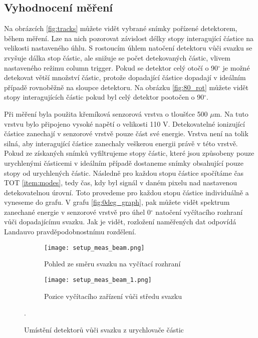 \subsection{Vyhodnocení měření}
	Na obrázcích \ref{fig:tracks} můžete vidět vybrané snímky pořízené detektorem, během měření. Lze na nich pozorovat závislost délky stopy interagující částice na velikosti nastaveného úhlu. S rostoucím úhlem natočení detektoru vůči svazku se zvyšuje dálka stop částic, ale snižuje se počet detekovaných částic, vlivem nastaveného režimu column trigger. Pokud se detektor celý otočí o 90$^{\circ}$ je možné detekovat větší množství částic, protože dopadající částice dopadají v ideálním případě rovnoběžně na sloupce detektoru. Na obrázku \ref{fig:80_rot} můžete vidět stopy interagujících částic pokud byl celý detektor pootočen o 90$^{\circ}$.
	
	\par
	Při měření byla použita křemíková senzorová vrstva o tloušťce 500 $\mu$m. Na tuto vrstvu bylo připojeno vysoké napětí o velikosti 110 V. Detekovatelné ionizující částice zanechají v senzorové vrstvě pouze část své energie. Vrstva není na tolik silná, aby interagující částice zanechaly veškerou energii právě v této vrstvě. Pokud ze získaných snímků vyfiltrujeme stopy částic, které jsou způsobeny pouze urychlenými částicemi v ideálním případě dostaneme snímky obsahující pouze stopy od urychlených částic. Následně pro každou stopu částice spočítáme čas TOT \ref{item:modes}, tedy čas, kdy byl signál v daném pixelu nad nastavenou detekovatelnou úrovní. Toto provedeme pro každou stopu částice individuálně a vyneseme do grafu. V grafu \ref{fig:0deg_graph}, pak můžete vidět spektrum zanechané energie v senzorové vrstvě pro úhel 0$^{\circ}$ natočení vyčítacího rozhraní vůči dopadajícímu svazku. Jak je vidět, rozložení naměřených dat odpovídá Landauvo pravděpodobnostnímu rozdělení. %
	
	\begin{figure}[h!]
		\captionsetup{justification=centering}
		\begin{subfigure}{0.5\textwidth}
			\centering
			\texttt{[image: setup\_meas\_beam.png]}
			\caption{Pohled ze směru svazku na vyčítací rozhraní}
			\label{fig:setup_meas_beam}
		\end{subfigure}
		\begin{subfigure}{0.5\textwidth}
			\centering
			\texttt{[image: setup\_meas\_beam\_1.png]}
			\caption{Pozice vyčítacího zařízení vůči středu svazku}
			\label{fig:setup_meas_beam_1}
		\end{subfigure}
		\caption{Umístění detektorů vůči svazku z urychlovače částic}. %
		\label{fig:setum_beam}
	\end{figure}
	
